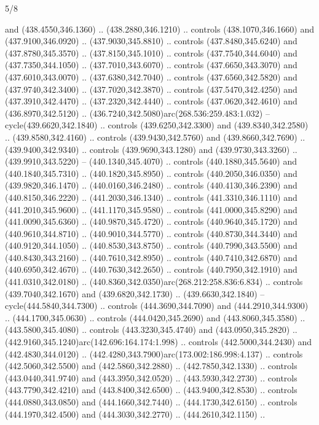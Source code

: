\begin{flagdescription}{5/8}
\begin{scope}[xshift=0.5\flaglength,yshift=0.5\flagwidth,scale=\flagwidth/475.63]
\begin{scope}[y=0.8pt, x=0.8pt, yscale=-1, xscale=1,shift={(-450,-300)}]
\begin{scope}[cm={{1.0,0.0,0.0,1.0,(-0.0002,0.12556)}},cm={{1.0,0.0,0.0,1.0,(0.00179,0.0)}}]
\begin{scope}[cm={{1.01375,0.0,0.0,1.01375,(-5.36379,-4.94943)}}]
  and (438.4550,346.1360) .. (438.2880,346.1210) .. controls (438.1070,346.1660)
  and (437.9100,346.0920) .. (437.9030,345.8810) .. controls (437.8480,345.6240)
  and (437.8780,345.3570) .. (437.8150,345.1010) .. controls (437.7540,344.6040)
  and (437.7350,344.1050) .. (437.7010,343.6070) .. controls (437.6650,343.3070)
  and (437.6010,343.0070) .. (437.6380,342.7040) .. controls (437.6560,342.5820)
  and (437.9740,342.3400) .. (437.7020,342.3870) .. controls (437.5470,342.4250)
  and (437.3910,342.4470) .. (437.2320,342.4440) .. controls (437.0620,342.4610)
  and (436.8970,342.5120) .. (436.7240,342.5080)arc(268.536:259.483:1.032) --
  cycle(439.6620,342.1840) .. controls (439.6250,342.3300) and
  (439.8340,342.2580) .. (439.8580,342.4160) .. controls (439.9430,342.5760) and
  (439.8660,342.7690) .. (439.9400,342.9340) .. controls (439.9690,343.1280) and
  (439.9730,343.3260) .. (439.9910,343.5220) -- (440.1340,345.4070) .. controls
  (440.1880,345.5640) and (440.1840,345.7310) .. (440.1820,345.8950) .. controls
  (440.2050,346.0350) and (439.9820,346.1470) .. (440.0160,346.2480) .. controls
  (440.4130,346.2390) and (440.8150,346.2220) .. (441.2030,346.1340) .. controls
  (441.3310,346.1110) and (441.2010,345.9600) .. (441.1170,345.9580) .. controls
  (441.0000,345.8290) and (441.0090,345.6360) .. (440.9870,345.4720) .. controls
  (440.9640,345.1720) and (440.9610,344.8710) .. (440.9010,344.5770) .. controls
  (440.8730,344.3440) and (440.9120,344.1050) .. (440.8530,343.8750) .. controls
  (440.7990,343.5500) and (440.8430,343.2160) .. (440.7610,342.8950) .. controls
  (440.7410,342.6870) and (440.6950,342.4670) .. (440.7630,342.2650) .. controls
  (440.7950,342.1910) and (441.0310,342.0180) ..
  (440.8360,342.0350)arc(268.212:258.836:6.834) .. controls (439.7040,342.1670)
  and (439.6820,342.1730) .. (439.6630,342.1840) -- cycle(444.5840,344.7300) ..
  controls (444.3690,344.7090) and (444.2910,344.9300) .. (444.1700,345.0630) ..
  controls (444.0420,345.2690) and (443.8060,345.3580) .. (443.5800,345.4080) ..
  controls (443.3230,345.4740) and (443.0950,345.2820) ..
  (442.9160,345.1240)arc(142.696:164.174:1.998) .. controls (442.5000,344.2430)
  and (442.4830,344.0120) .. (442.4280,343.7900)arc(173.002:186.998:4.137) ..
  controls (442.5060,342.5500) and (442.5860,342.2880) .. (442.7850,342.1330) ..
  controls (443.0440,341.9740) and (443.3950,342.0520) .. (443.5930,342.2730) ..
  controls (443.7790,342.4210) and (443.8400,342.6500) .. (443.9400,342.8530) ..
  controls (444.0880,343.0850) and (444.1660,342.7440) .. (444.1730,342.6150) ..
  controls (444.1970,342.4500) and (444.3030,342.2770) .. (444.2610,342.1150) ..

\end{scope}
\end{scope}
\end{scope}
\end{scope}
\end{flagdescription}
